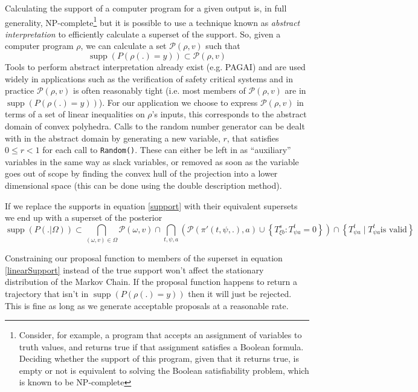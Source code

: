 \documentclass{article}
\DeclareMathOperator\supp{supp}
\begin{document}
Calculating the support of a computer program for a given output is, in full generality, NP-complete\footnote{Consider, for example, a program that accepts an assignment of variables to truth values, and returns true if that assignment satisfies a Boolean formula. Deciding whether the support of this program, given that it returns true, is empty or not is equivalent to solving the Boolean satisfiability problem, which is known to be NP-complete\cite{cook1971complexity}} but it is possible to use a technique known as \textit{abstract interpretation}\cite{cousot1977abstract} to efficiently calculate a superset of the support. So, given a computer program $\rho$, we can calculate a set $\mathcal{P}(\rho, v)$ such that
\[
\supp(P(\rho(.)=y)) \subset \mathcal{P}(\rho, v)
\]
Tools to perform abstract interpretation already exist (e.g. PAGAI\cite{henry2012pagai}) and are used widely in applications such as the verification of safety critical systems\cite{blanchet2003static} and in practice $\mathcal{P}(\rho, v)$ is often reasonably tight (i.e. most members of $\mathcal{P}(\rho, v)$ are in $\supp(P(\rho(.)=y))$). For our application we choose to express $\mathcal{P}(\rho, v)$ in terms of a set of linear inequalities on $\rho$'s inputs, this corresponds to the abstract domain of convex polyhedra\cite{cousot1978automatic}\cite{becchi2018efficient}. Calls to the random number generator can be dealt with in the abstract domain by generating a new variable, $r$, that satisfies $0 \le r < 1$ for each call to \texttt{Random()}. These can either be left in as ``auxiliary'' variables in the same way as slack variables, or removed as soon as the variable goes out of scope by finding the convex hull of the projection into a lower dimensional space (this can be done using the double description method\cite{motzkin1953double}).

If we replace the supports in equation \ref{support} with their equivalent supersets we end up with a superset of the posterior
\begin{equation}
\supp(P(.|\Omega)) \subset
\bigcap_{(\omega,v) \in \Omega}  \mathcal{P}(\omega, v) \cap
\bigcap_{t, \psi, a} \left( \mathcal{P}(\pi'(t,\psi,.), a) \cup \left\{T^s_{\xi b}: T^t_{\psi a} = 0\right\} \right)\cap
\left\{T^t_{\psi a} \mid T^t_{\psi a} \text{is valid}\right\}
\label{linearSupport}
\end{equation}

Constraining our proposal function to members of the superset in equation \ref{linearSupport} instead of the true support won't affect the stationary distribution of the Markov Chain. If the proposal function happens to return a trajectory that isn't in $\supp(P(\rho(.)=y))$ then it will just be rejected. This is fine as long as we generate acceptable proposals at a reasonable rate.
\end{document}
